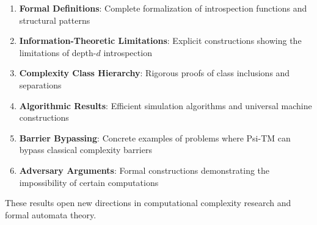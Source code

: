 \begin{enumerate}
\item \textbf{Formal Definitions}: Complete formalization of introspection functions and structural patterns
\item \textbf{Information-Theoretic Limitations}: Explicit constructions showing the limitations of depth-$d$ introspection
\item \textbf{Complexity Class Hierarchy}: Rigorous proofs of class inclusions and separations
\item \textbf{Algorithmic Results}: Efficient simulation algorithms and universal machine constructions
\item \textbf{Barrier Bypassing}: Concrete examples of problems where Psi-TM can bypass classical complexity barriers
\item \textbf{Adversary Arguments}: Formal constructions demonstrating the impossibility of certain computations
\end{enumerate}

These results open new directions in computational complexity research and formal automata theory.

